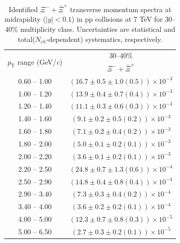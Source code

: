 \begin{table}
\caption{Identified $\Xi^{-} + \bar{\Xi}^{+}$ transverse momentum spectra at midrapidity ($|y|<0.1$) in pp collisions at 7 TeV for 30--40\% multiplicity class. Uncertainties are statistical and total($N_{ch}$-dependent) systematics, respectively.}
\label{tab:XiSum_30to40}
\begin{center}
\begin{tabular}{ c | c }
\hline
\multirow{2}{*}{$p_{\mathrm{T}}$ range (GeV/\textit{c})} & \multicolumn{1}{c}{30--40\%} \\ & $\Xi^{-} + \bar{\Xi}^{+}$\\ 
\hline
0.60 -- 1.00 & $(16.7\pm0.5\pm1.0(0.5))\times10^{-3}$ \\ 
1.00 -- 1.20 & $(13.9\pm0.4\pm0.7(0.4))\times10^{-3}$ \\ 
1.20 -- 1.40 & $(11.1\pm0.3\pm0.6(0.3))\times10^{-3}$ \\ 
1.40 -- 1.60 & $(9.1\pm0.2\pm0.5(0.2))\times10^{-3}$ \\ 
1.60 -- 1.80 & $(7.1\pm0.2\pm0.4(0.2))\times10^{-3}$ \\ 
1.80 -- 2.00 & $(5.0\pm0.1\pm0.2(0.1))\times10^{-3}$ \\ 
2.00 -- 2.20 & $(3.6\pm0.1\pm0.2(0.1))\times10^{-3}$ \\ 
2.20 -- 2.50 & $(24.8\pm0.7\pm1.3(0.6))\times10^{-4}$ \\ 
2.50 -- 2.90 & $(14.8\pm0.4\pm0.8(0.4))\times10^{-4}$ \\ 
2.90 -- 3.40 & $(7.3\pm0.3\pm0.4(0.2))\times10^{-4}$ \\ 
3.40 -- 4.00 & $(3.6\pm0.2\pm0.2(0.1))\times10^{-4}$ \\ 
4.00 -- 5.00 & $(12.3\pm0.7\pm0.8(0.3))\times10^{-5}$ \\ 
5.00 -- 6.50 & $(2.7\pm0.3\pm0.2(0.1))\times10^{-5}$ \\ 
\hline
\end{tabular}
\end{center}
\end{table}
 
